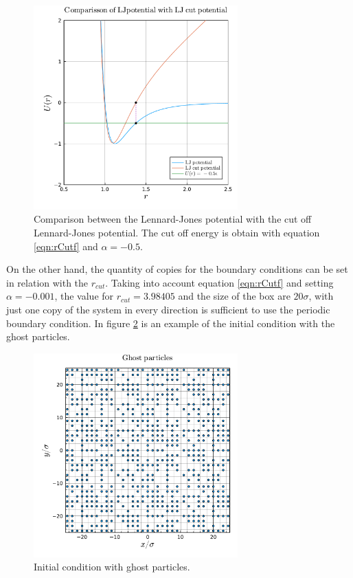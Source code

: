\documentclass[main.tex]{subfiles}
\begin{document}
\begin{figure}[ht]
    \centering
    \includegraphics[width=0.7\textwidth]{imgs/hw2/LennarJonesComparison.pdf}
    \caption{Comparison between the Lennard-Jones potential with the cut off Lennard-Jones potential.
        The cut off energy is obtain with equation \eqref{eqn:rCutf} and $\alpha = -0.5$.
    }
    \label{fig:comparisonPotantials}
\end{figure}

On the other hand, the quantity of copies for the boundary conditions can be set in relation with the $r_{cut}$.
Taking into account equation \eqref{eqn:rCutf} and setting $\alpha = -0.001$, the value for $r_{cut} = 3.98405$ and the size of the box are $20\sigma$, with just one copy of the system in every direction is sufficient to use the periodic boundary condition.
In figure \ref{fig:ghostParticles} is an example of the initial condition with the ghost particles.

\begin{figure}[ht]
    \centering
    \includegraphics[width=0.7\textwidth]{imgs/hw2/ghostParticles.pdf}
    \caption{Initial condition with ghost particles. }
    \label{fig:ghostParticles}
\end{figure}
\end{document}
